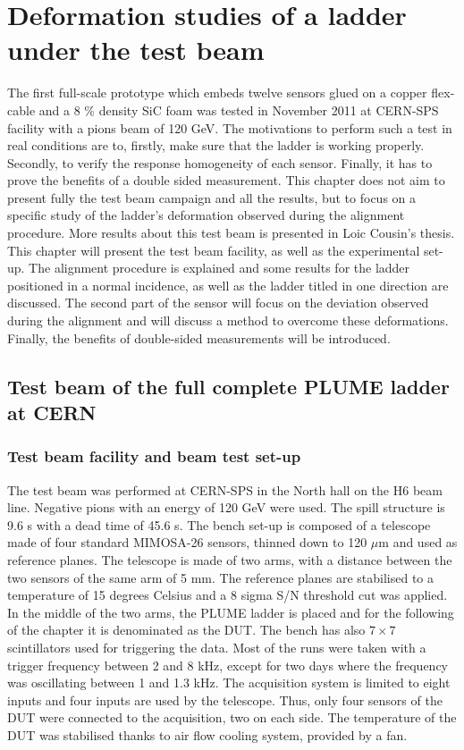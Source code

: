 \chapter{Deformation studies of a ladder under the test beam}

  The first full-scale prototype which embeds twelve sensors glued on a copper flex-cable and a 8 \% density \gls{SiC} foam was tested in November 2011 at CERN-SPS facility with a pions beam of 120 GeV.
  The motivations to perform such a test in real conditions are to, firstly, make sure that the ladder is working properly.
  Secondly, to verify the response homogeneity of each sensor.
  Finally, it has to prove the benefits of a double sided measurement.
  This chapter does not aim to present fully the test beam campaign and all the results, but to focus on a specific study of the ladder's deformation observed during the alignment procedure.
  More results about this test beam is presented in Loic Cousin's thesis\cite{cousin}.
  This chapter will present the test beam facility, as well as the experimental set-up.
  The alignment procedure is explained and some results for the ladder positioned in a normal incidence, as well as the ladder titled in one direction are discussed.
  The second part of the sensor will focus on the deviation observed during the alignment and will discuss a method to overcome these deformations.
  Finally, the benefits of double-sided measurements will be introduced.
  
  \minitoc

  \section{Test beam of the full complete PLUME ladder at CERN}

    \subsection{Test beam facility and beam test set-up}

    The test beam was performed at CERN-SPS in the North hall on the H6 beam line.
    Negative pions with an energy of 120 GeV were used.
    The spill structure is 9.6 s with a dead time of 45.6 s. 
    The bench set-up is composed of a telescope made of four standard MIMOSA-26 sensors, thinned down to 120 $\mu\text{m}$ and used as reference planes.
    The telescope is made of two arms, with a distance between the two sensors of the same arm of 5 mm.
    The reference planes are stabilised to a temperature of 15 degrees Celsius and a 8 sigma S/N threshold cut was applied.
    In the middle of the two arms, the PLUME ladder is placed and for the following of the chapter it is denominated as the \gls{DUT}.
    The bench has also $7 \times 7$ scintillators used for triggering the data.
    Most of the runs were taken with a trigger frequency between 2 and 8 kHz, except for two days where the frequency was oscillating between 1 and 1.3 kHz.
    The acquisition system is limited to eight inputs and four inputs are used by the telescope.
    Thus, only four sensors of the \gls{DUT} were connected to the acquisition, two on each side.
    The temperature of the \gls{DUT} was stabilised thanks to air flow cooling system, provided by a fan.

